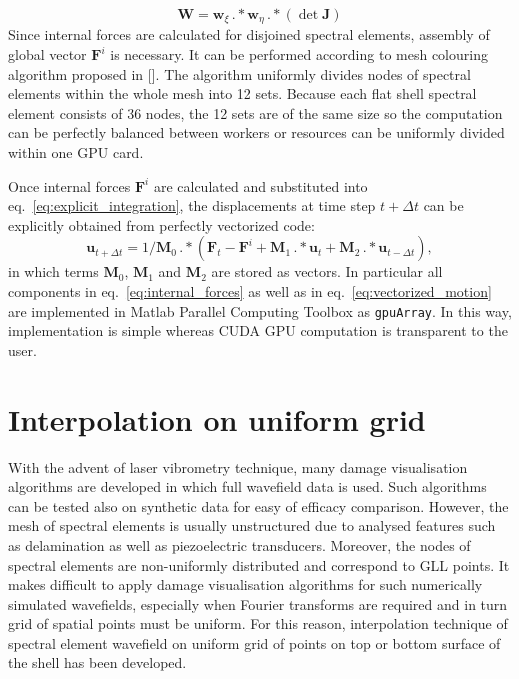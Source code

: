 \documentclass[preprint,12pt]{elsarticle}
\renewcommand{\vec}[1]{\mathbf{#1}}
\begin{document}
	\begin{equation}
	\vec{W} = \vec{w}_{\xi}\,.*\vec{w}_{\eta}\,.*\left(\det\vec{J}\right)
	\end{equation}
	Since internal forces are calculated for disjoined spectral elements, assembly of global vector $\vec{F}^i$ is necessary. It can be performed according to mesh colouring algorithm proposed in []. The algorithm uniformly divides nodes of spectral elements within the whole mesh into 12 sets. Because each flat shell spectral element consists of 36 nodes, the 12 sets are of the same size so the computation can be perfectly balanced between workers or resources can be uniformly divided within one GPU card.
	
	Once internal forces $\vec{F}^i$ are calculated and substituted into eq.~\ref{eq:explicit_integration}, the displacements at time step $t+\Delta t$ can be explicitly obtained from perfectly vectorized code:
	\begin{equation}
	\vec{u}_{t+\Delta t}=1/\vec{M}_0\, .*\left(\vec{F}_t - \vec{F}^i +\vec{M}_1 \, .* \vec{u}_t +\vec{M}_2 \, .* \vec{u}_{t-\Delta t}\right),
	\label{eq:vectorized_motion}
	\end{equation} 
	in which terms $\vec{M}_0$, $\vec{M}_1$ and $\vec{M}_2$ are stored as vectors. In particular all components in eq.~\ref{eq:internal_forces} as well as in eq.~\ref{eq:vectorized_motion} are implemented in Matlab Parallel Computing Toolbox as \verb|gpuArray|. In this way, implementation is simple whereas CUDA GPU computation is transparent to the user.
	\section{Interpolation on uniform grid}
	With the advent of laser vibrometry technique, many damage visualisation algorithms are developed in which full wavefield data is used. Such algorithms can be tested also on synthetic data for easy of efficacy comparison. However, the mesh of spectral elements is usually unstructured due to analysed features such as delamination as well as piezoelectric transducers. Moreover, the nodes of spectral elements are non-uniformly distributed and correspond to GLL points. It makes difficult to apply damage visualisation algorithms for such numerically simulated wavefields, especially when Fourier transforms are required and in turn grid of spatial points must be uniform. For this reason, interpolation technique of spectral element wavefield on uniform grid of points on top or bottom surface of the shell has been developed.
\end{document}
